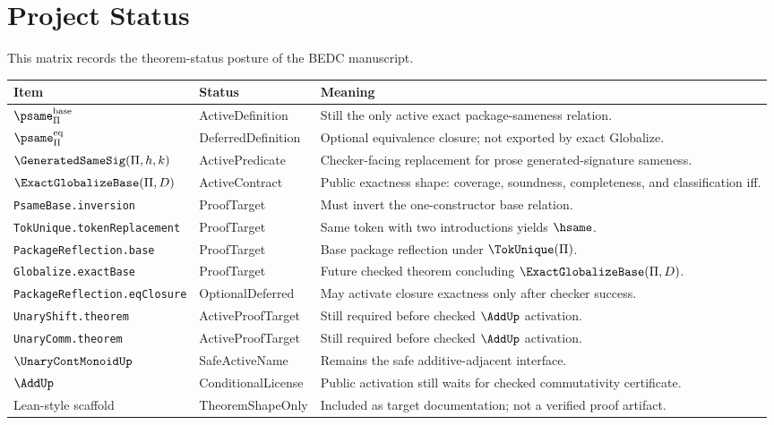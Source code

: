 \chapter*{Project Status}
\label{ch:project-status}

This matrix records the theorem-status posture of the BEDC manuscript.

\begin{longtable}{p{}p{}p{}}
\toprule
\textbf{Item} & \textbf{Status} & \textbf{Meaning}\\
\midrule
\(\psame_{\Pi}^{\mathrm{base}}\) & ActiveDefinition & Still the only active exact package-sameness relation.\\
\(\psame_{\Pi}^{\mathrm{eq}}\) & DeferredDefinition & Optional equivalence closure; not exported by exact Globalize.\\
\(\GeneratedSameSig(\Pi,h,k)\) & ActivePredicate & Checker-facing replacement for prose generated-signature sameness.\\
\(\ExactGlobalizeBase(\Pi,D)\) & ActiveContract & Public exactness shape: coverage, soundness, completeness, and classification iff.\\
\texttt{PsameBase.inversion} & ProofTarget & Must invert the one-constructor base relation.\\
\texttt{TokUnique.tokenReplacement} & ProofTarget & Same token with two introductions yields \(\hsame\).\\
\texttt{PackageReflection.base} & ProofTarget & Base package reflection under \(\TokUnique(\Pi)\).\\
\texttt{Globalize.exactBase} & ProofTarget & Future checked theorem concluding \(\ExactGlobalizeBase(\Pi,D)\).\\
\texttt{PackageReflection.eqClosure} & OptionalDeferred & May activate closure exactness only after checker success.\\
\texttt{UnaryShift.theorem} & ActiveProofTarget & Still required before checked \(\AddUp\) activation.\\
\texttt{UnaryComm.theorem} & ActiveProofTarget & Still required before checked \(\AddUp\) activation.\\
\(\UnaryContMonoidUp\) & SafeActiveName & Remains the safe additive-adjacent interface.\\
\(\AddUp\) & ConditionalLicense & Public activation still waits for checked commutativity certificate.\\
Lean-style scaffold & TheoremShapeOnly & Included as target documentation; not a verified proof artifact.\\

\end{longtable}
